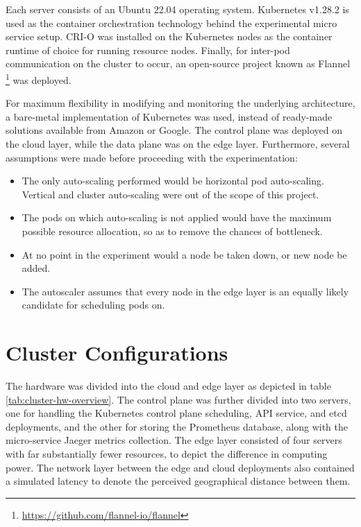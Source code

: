 Each server consists of an Ubuntu 22.04 operating system. Kubernetes v1.28.2 is used as the container orchestration technology behind the experimental micro service setup. CRI-O was installed on the Kubernetes nodes as the container runtime of choice for running resource nodes. Finally, for inter-pod communication on the cluster to occur, an open-source project known as Flannel \footnote{\url{https://github.com/flannel-io/flannel}} was deployed.\par

For maximum flexibility in modifying and monitoring the underlying architecture, a bare-metal implementation of Kubernetes was used, instead of ready-made solutions available from Amazon or Google. The control plane was deployed on the cloud layer, while the data plane was on the edge layer. Furthermore, several assumptions were made before proceeding with the experimentation:

\begin{itemize}
    \item The only auto-scaling performed would be horizontal pod auto-scaling. Vertical and cluster auto-scaling were out of the scope of this project.
    \item The pods on which auto-scaling is not applied would have the maximum possible resource allocation, so as to remove the chances of bottleneck.
    \item At no point in the experiment would a node be taken down, or new node be added.
    \item The autoscaler assumes that every node in the edge layer is an equally likely candidate for scheduling pods on.
\end{itemize}

\section{Cluster Configurations}
\label{sec:ch5-cluster-config}

The hardware was divided into the cloud and edge layer as depicted in table \ref{tab:cluster-hw-overview}. The control plane was further divided into two servers, one for handling the Kubernetes control plane scheduling, API service, and etcd deployments, and the other for storing the Prometheus database, along with the micro-service Jaeger metrics collection. The edge layer consisted of four servers with far substantially fewer resources, to depict the difference in computing power. The network layer between the edge and cloud deployments also contained a simulated latency to denote the perceived geographical distance between them.\par

